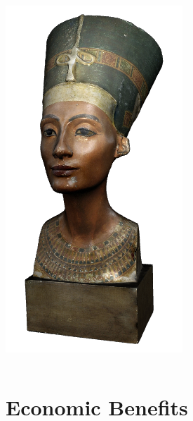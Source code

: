 \begin{frame}
\begin{columns}
\begin{column}{0.2\textwidth}
      \includegraphics[width=.9\textwidth]{images/nefertiti}
    \end{column}
  \end{columns}
\end{frame}

\section{Economic Benefits}

